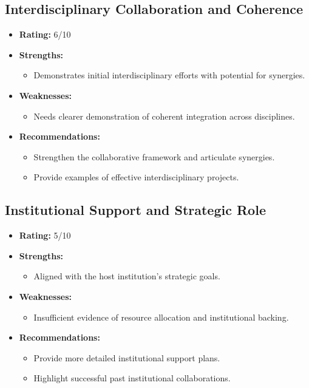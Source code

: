 \documentclass{article}
\begin{document}
\subsection{Interdisciplinary Collaboration and Coherence}
\begin{itemize}
    \item \textbf{Rating:} 6/10
    \item \textbf{Strengths:}
        \begin{itemize}
            \item Demonstrates initial interdisciplinary efforts with potential for synergies.
        \end{itemize}
    \item \textbf{Weaknesses:}
        \begin{itemize}
            \item Needs clearer demonstration of coherent integration across disciplines.
        \end{itemize}
    \item \textbf{Recommendations:}
        \begin{itemize}
            \item Strengthen the collaborative framework and articulate synergies.
            \item Provide examples of effective interdisciplinary projects.
        \end{itemize}
\end{itemize}

\subsection{Institutional Support and Strategic Role}
\begin{itemize}
    \item \textbf{Rating:} 5/10
    \item \textbf{Strengths:}
        \begin{itemize}
            \item Aligned with the host institution's strategic goals.
        \end{itemize}
    \item \textbf{Weaknesses:}
        \begin{itemize}
            \item Insufficient evidence of resource allocation and institutional backing.
        \end{itemize}
    \item \textbf{Recommendations:}
        \begin{itemize}
            \item Provide more detailed institutional support plans.
            \item Highlight successful past institutional collaborations.
        \end{itemize}
\end{itemize}
\end{document}
